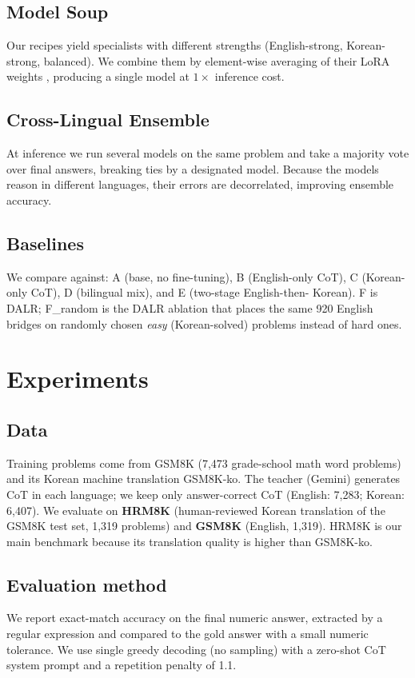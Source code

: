 \documentclass{article}
\begin{document}
\subsection{Model Soup}
\label{sec:soup}
Our recipes yield specialists with different strengths (English-strong,
Korean-strong, balanced). We combine them by element-wise averaging of
their LoRA weights \citep{wortsman2022soup}, producing a single model at
$1\times$ inference cost.

\subsection{Cross-Lingual Ensemble}
\label{sec:clsc}
At inference we run several models on the same problem and take a
majority vote over final answers, breaking ties by a designated model.
Because the models reason in different languages, their errors are
decorrelated, improving ensemble accuracy.

\subsection{Baselines}
We compare against: A (base, no fine-tuning), B (English-only CoT), C
(Korean-only CoT), D (bilingual mix), and E (two-stage English-then-
Korean). F is DALR; F\_random is the DALR ablation that places the same
920 English bridges on randomly chosen \emph{easy} (Korean-solved)
problems instead of hard ones.

\section{Experiments}
\label{sec:exp}

\subsection{Data}
Training problems come from GSM8K (7{,}473 grade-school math word
problems) and its Korean machine translation GSM8K-ko. The teacher
(Gemini) generates CoT in each language; we keep only answer-correct CoT
(English: 7{,}283; Korean: 6{,}407). We evaluate on \textbf{HRM8K}
(human-reviewed Korean translation of the GSM8K test set, 1{,}319
problems) and \textbf{GSM8K} (English, 1{,}319). HRM8K is our main
benchmark because its translation quality is higher than GSM8K-ko.

\subsection{Evaluation method}
We report exact-match accuracy on the final numeric answer, extracted by
a regular expression and compared to the gold answer with a small
numeric tolerance. We use single greedy decoding (no sampling) with a
zero-shot CoT system prompt and a repetition penalty of 1.1.
\end{document}

